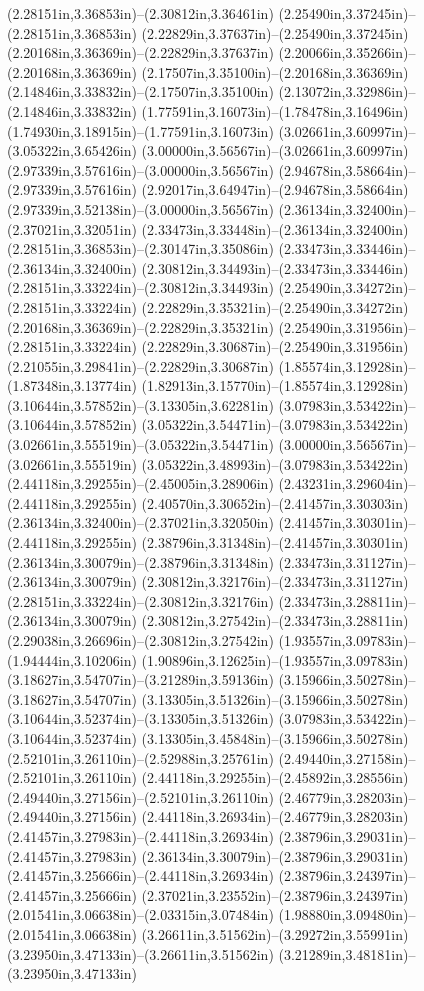 (2.28151in,3.36853in)--(2.30812in,3.36461in) (2.25490in,3.37245in)--(2.28151in,3.36853in) (2.22829in,3.37637in)--(2.25490in,3.37245in) (2.20168in,3.36369in)--(2.22829in,3.37637in) (2.20066in,3.35266in)--(2.20168in,3.36369in) (2.17507in,3.35100in)--(2.20168in,3.36369in) (2.14846in,3.33832in)--(2.17507in,3.35100in) (2.13072in,3.32986in)--(2.14846in,3.33832in) (1.77591in,3.16073in)--(1.78478in,3.16496in) (1.74930in,3.18915in)--(1.77591in,3.16073in) (3.02661in,3.60997in)--(3.05322in,3.65426in) (3.00000in,3.56567in)--(3.02661in,3.60997in) (2.97339in,3.57616in)--(3.00000in,3.56567in) (2.94678in,3.58664in)--(2.97339in,3.57616in) (2.92017in,3.64947in)--(2.94678in,3.58664in) (2.97339in,3.52138in)--(3.00000in,3.56567in) (2.36134in,3.32400in)--(2.37021in,3.32051in) (2.33473in,3.33448in)--(2.36134in,3.32400in) (2.28151in,3.36853in)--(2.30147in,3.35086in) (2.33473in,3.33446in)--(2.36134in,3.32400in) (2.30812in,3.34493in)--(2.33473in,3.33446in) (2.28151in,3.33224in)--(2.30812in,3.34493in) (2.25490in,3.34272in)--(2.28151in,3.33224in) (2.22829in,3.35321in)--(2.25490in,3.34272in) (2.20168in,3.36369in)--(2.22829in,3.35321in) (2.25490in,3.31956in)--(2.28151in,3.33224in) (2.22829in,3.30687in)--(2.25490in,3.31956in) (2.21055in,3.29841in)--(2.22829in,3.30687in) (1.85574in,3.12928in)--(1.87348in,3.13774in) (1.82913in,3.15770in)--(1.85574in,3.12928in) (3.10644in,3.57852in)--(3.13305in,3.62281in) (3.07983in,3.53422in)--(3.10644in,3.57852in) (3.05322in,3.54471in)--(3.07983in,3.53422in) (3.02661in,3.55519in)--(3.05322in,3.54471in) (3.00000in,3.56567in)--(3.02661in,3.55519in) (3.05322in,3.48993in)--(3.07983in,3.53422in) (2.44118in,3.29255in)--(2.45005in,3.28906in) (2.43231in,3.29604in)--(2.44118in,3.29255in) (2.40570in,3.30652in)--(2.41457in,3.30303in) (2.36134in,3.32400in)--(2.37021in,3.32050in) (2.41457in,3.30301in)--(2.44118in,3.29255in) (2.38796in,3.31348in)--(2.41457in,3.30301in) (2.36134in,3.30079in)--(2.38796in,3.31348in) (2.33473in,3.31127in)--(2.36134in,3.30079in) (2.30812in,3.32176in)--(2.33473in,3.31127in) (2.28151in,3.33224in)--(2.30812in,3.32176in) (2.33473in,3.28811in)--(2.36134in,3.30079in) (2.30812in,3.27542in)--(2.33473in,3.28811in) (2.29038in,3.26696in)--(2.30812in,3.27542in) (1.93557in,3.09783in)--(1.94444in,3.10206in) (1.90896in,3.12625in)--(1.93557in,3.09783in) (3.18627in,3.54707in)--(3.21289in,3.59136in) (3.15966in,3.50278in)--(3.18627in,3.54707in) (3.13305in,3.51326in)--(3.15966in,3.50278in) (3.10644in,3.52374in)--(3.13305in,3.51326in) (3.07983in,3.53422in)--(3.10644in,3.52374in) (3.13305in,3.45848in)--(3.15966in,3.50278in) (2.52101in,3.26110in)--(2.52988in,3.25761in) (2.49440in,3.27158in)--(2.52101in,3.26110in) (2.44118in,3.29255in)--(2.45892in,3.28556in) (2.49440in,3.27156in)--(2.52101in,3.26110in) (2.46779in,3.28203in)--(2.49440in,3.27156in) (2.44118in,3.26934in)--(2.46779in,3.28203in) (2.41457in,3.27983in)--(2.44118in,3.26934in) (2.38796in,3.29031in)--(2.41457in,3.27983in) (2.36134in,3.30079in)--(2.38796in,3.29031in) (2.41457in,3.25666in)--(2.44118in,3.26934in) (2.38796in,3.24397in)--(2.41457in,3.25666in) (2.37021in,3.23552in)--(2.38796in,3.24397in) (2.01541in,3.06638in)--(2.03315in,3.07484in) (1.98880in,3.09480in)--(2.01541in,3.06638in) (3.26611in,3.51562in)--(3.29272in,3.55991in) (3.23950in,3.47133in)--(3.26611in,3.51562in) (3.21289in,3.48181in)--(3.23950in,3.47133in) 